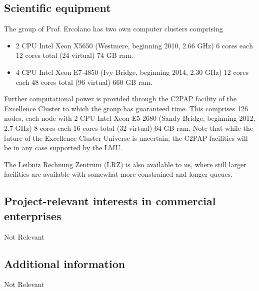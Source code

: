 \documentclass[10pt,fleqn,twoside]{article}
\newcommand{\Tcol}{\color{blue}}
\begin{document}
\subsection{\Tcol Scientific equipment}

The group of Prof. Ercolano has two own computer clusters comprising 

\begin{itemize}
\item 2 CPU Intel Xeon X5650 (Westmere, beginning
2010, 2.66 GHz) 6 cores each 12 cores total (24 virtual) 74 GB ram.

\item 4 CPU Intel Xeon E7-4850 (Ivy Bridge, beginning 2014, 2.30 GHz)
12 cores each 48 cores total (96 virtual) 660 GB ram.

\end{itemize}

Further computational power is provided through the C2PAP facility of the Excellence Cluster to which
the group has guaranteed time. This comprises 126 nodes, each node with 2 CPU Intel Xeon E5-2680 (Sandy
Bridge, beginning 2012, 2.7 GHz) 8 cores each 16 cores total (32
virtual) 64 GB ram. Note that while the future of the Excellence
Cluster Universe is uncertain, the C2PAP facilities will be in any
case supported by the LMU. 

The Leibniz Rechnung Zentrum (LRZ) is also available to us, where still
larger facilities are available with somewhat more constrained and longer queues.



\subsection{\Tcol Project-relevant interests in commercial enterprises}

Not Relevant


\subsection{\Tcol Additional information}

Not Relevant
\end{document}
